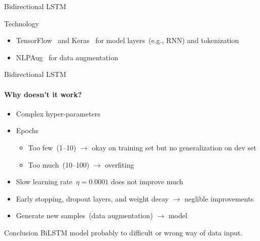 \documentclass[english,handout]{mlutalk}
\newcommand{\BiLSTM}{\mbox{BiLSTM}\xspace}
\begin{document}
\begin{frame}[allowframebreaks]{Bidirectional LSTM}
  \begin{block}{Technology}
      \begin{itemize}
        \item TensorFlow~\cite{Abadi2015} and Keras~\cite{Chollet2015} for model layers~(e.g., RNN) and tokenization
        \item NLPAug~\cite{Edward2019} for data augmentation
      \end{itemize}
  \end{block}

\end{frame}

\begin{frame}{Bidirectional LSTM}
  \framesubtitle{Why doesn't it work?}

  \begin{itemize}
    \item Complex hyper-parameters
    \item Epochs
    \begin{itemize}
      \item Too few~(1--10) \(\to\) okay on training set but no generalization on dev set
      \item Too much~(10--100) \(\to\) overfiting
    \end{itemize}
    \item Slow learning rate~\(\eta = 0.0001\) does not improve much
    \item Early stopping, dropout layers, and weight decay \(\to\) neglible improvements
    \item Generate new samples~(data augmentation) \(\to\)  model
  \end{itemize}

  \begin{block}{Conclusion}
    \BiLSTM model probably to difficult or wrong way of data input.
  \end{block}

\end{frame}
\end{document}
